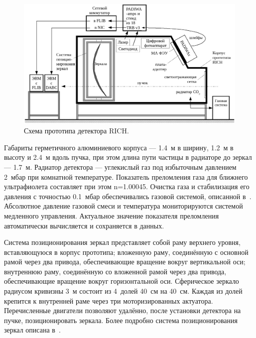 \begin{figure}[H]
\centering
\includegraphics[width=1.0\textwidth]{pictures/10_Beamtime_setup_RICH_text.png}
\caption{Схема прототипа детектора RICH.}
\label{fig:Prototype}
\end{figure}

Габариты герметичного алюминиевого корпуса --- 1.4~м в ширину, 1.2~м в высоту и 2.4~м вдоль пучка, при этом длина пути частицы в радиаторе до зеркал --- 1.7~м. Радиатор детектора --- углекислый газ под избыточным давлением 2~мбар при комнатной температуре. Показатель преломления газа для ближнего ультрафиолета составляет при этом n=1.00045. Очистка газа и стабилизация его давления с точностью 0.1~мбар обеспечивались газовой системой, описанной в~\cite{GASSYS}. Абсолютное давление газовой смеси и температура мониторируются системой медленного управления. Актуальное значение показателя преломления автоматически вычисляется и сохраняется в данных.

Система позиционирования зеркал представляет собой раму верхнего уровня, вставляющуюся в корпус прототипа; вложенную раму, соединённую с основной рамой через два привода, обеспечивающие вращение вокруг вертикальной оси; внутреннюю раму, соединённую со вложенной рамой через два привода, обеспечивающие вращение вокруг горизонтальной оси. Сферическое зеркало радиусом кривизны 3~м состоит из 4~долей 40~см на 40~см. Каждая из долей крепится к внутренней раме через три моторизированных актуатора. Перечисленные двигатели позволяют удалённо, после установки детектора на пучке, позиционировать зеркала. Более подробно система позиционирования зеркал описана в~\cite{MIRRORMIS}.

